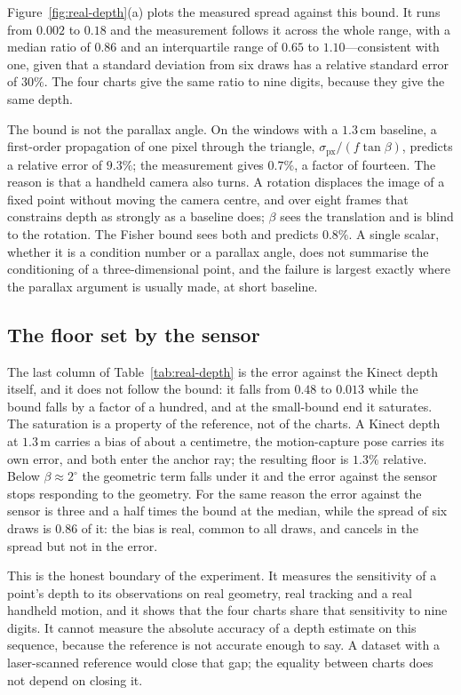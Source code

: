 \documentclass[11pt,a4paper]{article}
\theoremstyle{definition}
\theoremstyle{remark}
\begin{document}
Figure~\ref{fig:real-depth}(a) plots the measured spread against this bound. It runs from $0.002$ to $0.18$ and the measurement follows it across the whole range, with a median ratio of $0.86$ and an interquartile range of $0.65$ to $1.10$---consistent with one, given that a standard deviation from six draws has a relative standard error of $30\%$. The four charts give the same ratio to nine digits, because they give the same depth.

The bound is not the parallax angle. On the windows with a $1.3$\,cm baseline, a first-order propagation of one pixel through the triangle, $\sigma_{\mathrm{px}}/(f\tan\beta)$, predicts a relative error of $9.3\%$; the measurement gives $0.7\%$, a factor of fourteen. The reason is that a handheld camera also turns. A rotation displaces the image of a fixed point without moving the camera centre, and over eight frames that constrains depth as strongly as a baseline does; $\beta$ sees the translation and is blind to the rotation. The Fisher bound sees both and predicts $0.8\%$. A single scalar, whether it is a condition number or a parallax angle, does not summarise the conditioning of a three-dimensional point, and the failure is largest exactly where the parallax argument is usually made, at short baseline.

\subsection{The floor set by the sensor}

The last column of Table~\ref{tab:real-depth} is the error against the Kinect depth itself, and it does not follow the bound: it falls from $0.48$ to $0.013$ while the bound falls by a factor of a hundred, and at the small-bound end it saturates. The saturation is a property of the reference, not of the charts. A Kinect depth at $1.3$\,m carries a bias of about a centimetre, the motion-capture pose carries its own error, and both enter the anchor ray; the resulting floor is $1.3\%$ relative. Below $\beta\approx2^\circ$ the geometric term falls under it and the error against the sensor stops responding to the geometry. For the same reason the error against the sensor is three and a half times the bound at the median, while the spread of six draws is $0.86$ of it: the bias is real, common to all draws, and cancels in the spread but not in the error.

This is the honest boundary of the experiment. It measures the sensitivity of a point's depth to its observations on real geometry, real tracking and a real handheld motion, and it shows that the four charts share that sensitivity to nine digits. It cannot measure the absolute accuracy of a depth estimate on this sequence, because the reference is not accurate enough to say. A dataset with a laser-scanned reference would close that gap; the equality between charts does not depend on closing it.
\end{document}
